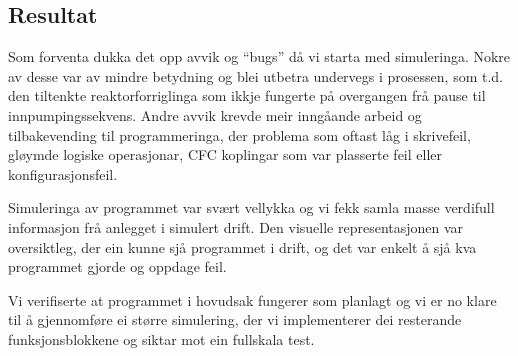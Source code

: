 \newpage

\subsection{Resultat}

Som forventa dukka det opp avvik og ``bugs'' då vi starta med simuleringa.
Nokre av desse var av mindre betydning og blei utbetra undervegs i prosessen, som t.d. den tiltenkte
reaktorforriglinga som ikkje fungerte på overgangen frå pause til innpumpingssekvens. \newline
Andre avvik krevde meir inngåande arbeid og tilbakevending til programmeringa, der problema som oftast låg i skrivefeil, gløymde logiske operasjonar,
\gls{CFC} koplingar som var plasserte feil eller konfigurasjonsfeil.

Simuleringa av programmet var svært vellykka og vi fekk samla masse verdifull informasjon frå anlegget i simulert drift. 
Den visuelle representasjonen var oversiktleg, der ein kunne sjå programmet i drift, og det var enkelt å sjå kva programmet gjorde og oppdage feil. 

Vi verifiserte at programmet i hovudsak fungerer som planlagt og vi er no klare til å gjennomføre ei større simulering,
der vi implementerer dei resterande funksjonsblokkene og siktar mot ein fullskala test.





